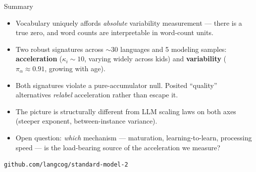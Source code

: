 \documentclass[aspectratio=169,t]{beamer}
\begin{document}
\begin{frame}{Summary}

\begin{itemize}\setlength\itemsep{0.6em}
\item Vocabulary uniquely affords \emph{absolute} variability
  measurement --- there is a true zero, and word counts are
  interpretable in word-count units.
\item Two robust signatures across $\sim$30 languages and 5 modeling
  samples: \textbf{acceleration} ($\kappa_i \sim 10$, varying widely
  across kids) and \textbf{variability} ($\pi_\alpha \approx 0.91$,
  growing with age).
\item Both signatures violate a pure-accumulator null. Posited
  ``quality'' alternatives \emph{relabel} acceleration rather than
  escape it.
\item The picture is structurally different from LLM scaling laws on
  both axes (steeper exponent, between-instance variance).
\item Open question: \emph{which} mechanism --- maturation,
  learning-to-learn, processing speed --- is the load-bearing source of
  the acceleration we measure?
\end{itemize}

\vspace{0.6em}
\centering
\small \texttt{github.com/langcog/standard-model-2}

\end{frame}
\end{document}
